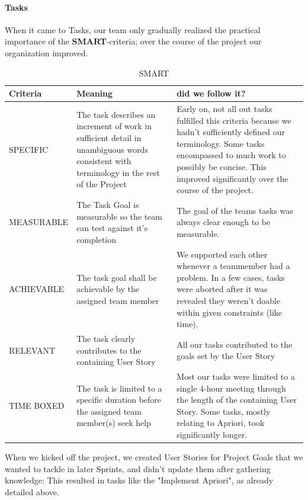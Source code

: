 \paragraph{Tasks} 
When it came to Tasks, our team only gradually realized the practical importance of the \textbf{ SMART}-criteria; over the course of the project our organization improved.


\begin{table}[h!]
  \caption{SMART}
  \label{SMART}
  \centering
  \begin{tabular}{|p{3cm} | p{5cm}| p{5cm}|}
	\hline  	 
  	 Criteria & Meaning & did we follow it? \\ 
  	 \hline
  	 \hline
  	\hfill \break SPECIFIC & 
  	The task describes an increment of work in sufficient detail in unambiguous words consistent with terminology in the rest of the Project & 
  	 Early on, not all out tasks fulfilled this criteria because we hadn't sufficiently defined our terminology. Some tasks encompassed to much work to possibly  be concise. This improved significantly over the course of the project.\\ 
  	\hline
  	\hfill \break MEASURABLE &
  	 The Task Goal is measurable so the team can test against it's completion & The goal of the teams tasks was always clear enough to be measurable. \\ 
  	\hline
  	\hfill \break ACHIEVABLE &
  	 The task goal shall be achievable by the assigned team member &
  	 We supported each other whenever a teammember had a problem. In a few cases, tasks were aborted after it was revealed they weren't doable within given constraints (like time).   \\ 
  	\hline
  	\hfill \break RELEVANT &
  	 The task clearly contributes to the containing User Story & 
  	 All our tasks contributed to the goals set by the User Story   \\ 
  	\hline
  	\hfill \break TIME BOXED &
  	 The task is limited to a specific duration before the assigned team member(s) seek help & Most our tasks were limited to a single 4-hour meeting through the length of the containing User Story. Some tasks, mostly relating to Apriori, took significantly longer. 
  	    \\ 
  	\hline
  	  \end{tabular}
\end{table}

When we kicked off the project, we created User Stories for Project Goals that we wanted to tackle in later Sprints, and didn't update them after gathering knowledge; This resulted in tasks like the "Implement Apriori", as already detailed above.
\newpage

